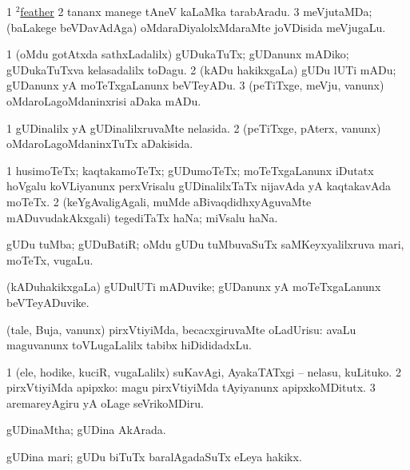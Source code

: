 \noindent
\gl{\pagu}
\bmng
\bnum
\num{1} \hyperref{kandict_f.pdf}{F}{feather(2) nuga(1)}{$^2$feather}  
\num{2}  tananx manege tAneV kaLaMka tarabAradu. 
\num{3}  meVjutaMDa; (baLakege beVDavAdAga) oMdaraDiyalolxMdaraMte joVDisida meVjugaLu. 
\enum
\emng
\eentry

\bentry
{}
\gl{\akirx}
\bmng
\bnum
\num{1} (oMdu gotAtxda sathxLadalilx) gUDukaTuTx; gUDanunx mADiko; gUDukaTuTxva kelasadalilx toDagu. 
\num{2} (kADu hakikxgaLa) gUDu lUTi mADu; gUDanunx yA moTeTxgaLanunx beVTeyADu. 
\num{3} (peTiTxge, meVju, \mo vanunx) oMdaroLagoMdaninxrisi aDaka mADu. 
\enum
\emng
\eentry

\bentry
{}
\gl{\gu}
\bmng
\bnum
\num{1} gUDinalilx yA gUDinalilxruvaMte nelasida. 
\num{2} (peTiTxge, pAterx, \mo vanunx) oMdaroLagoMdaninxTuTx aDakisida. 
\enum
\emng
\eentry

\bentry
{}
\gl{\nA}
\bmng
\bnum
\num{1} husimoTeTx; kaqtakamoTeTx; gUDumoTeTx; moTeTxgaLanunx iDutatx hoVgalu koVLiyanunx perxVrisalu gUDinalilxTaTx nijavAda yA kaqtakavAda moTeTx. 
\num{2} (keYgAvaligAgali, muMde aBivaqdidhxyAguvaMte mADuvudakAkxgali) tegediTaTx haNa; miVsalu haNa. 
\enum
\emng
\eentry

\bentry
{}
\gl{\nA}
\bmng
gUDu tuMba; gUDuBatiR; oMdu gUDu tuMbuvaSuTx saMKeyxyalilxruva mari, moTeTx, \mo vugaLu. 
\emng
\eentry

\bentry
{}
\gl{\nA}
\bmng
(kADuhakikxgaLa) gUDulUTi mADuvike; gUDanunx yA moTeTxgaLanunx beVTeyADuvike. 
\emng
\eentry

\bentry
{}
\gl{\sakirx}
\bmng
(tale, Buja, \mo vanunx) pirxVtiyiMda, becacxgiruvaMte oLadUrisu:  avaLu maguvanunx toVLugaLalilx tabibx hiDididadxLu. 
\emng

\noindent
\gl{\akirx}
\bmng
\bnum
\num{1} (ele, hodike, kuciR, \mo vugaLalilx) suKavAgi, AyakaTATxgi -- nelasu, kuLituko. 
\num{2} pirxVtiyiMda apipxko:  magu pirxVtiyiMda tAyiyanunx apipxkoMDitutx. 
\num{3} aremareyAgiru yA oLage seVrikoMDiru. 
\enum
\emng
\eentry

\bentry
{}
\gl{\gu}
\bmng
gUDinaMtha; gUDina AkArada. 
\emng
\eentry

\bentry
{}
\gl{\nA}
\bmng
gUDina mari; gUDu biTuTx baralAgadaSuTx eLeya hakikx. 
\emng
\eentry

